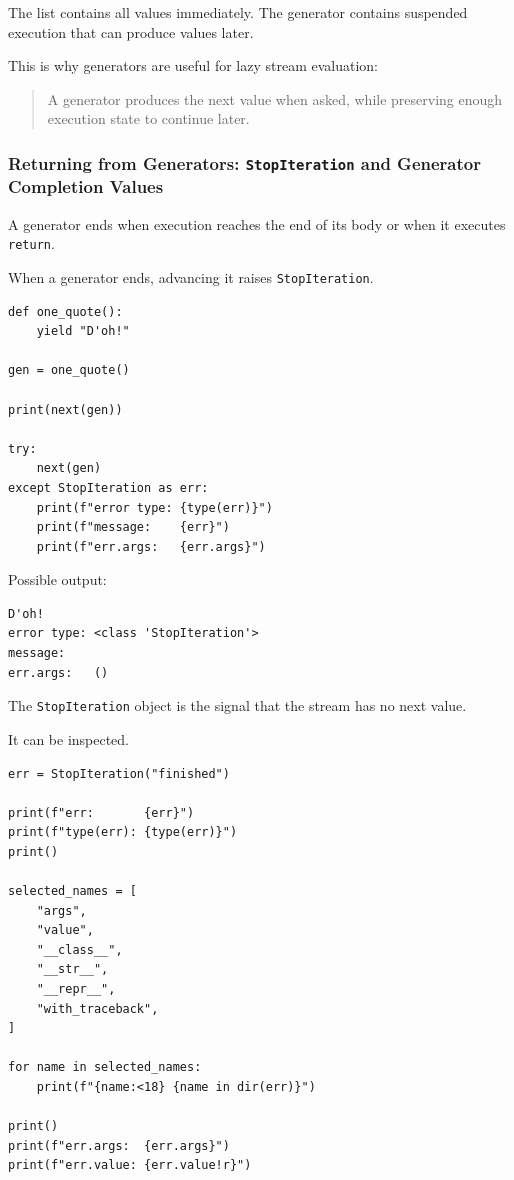 The list contains all values immediately. The generator contains suspended execution that can produce values later.

This is why generators are useful for lazy stream evaluation:

\begin{quote}
A generator produces the next value when asked, while preserving enough execution state to continue later.
\end{quote}

\subsubsection{Returning from Generators: \texttt{StopIteration} and Generator Completion Values}

A generator ends when execution reaches the end of its body or when it executes \texttt{return}.

When a generator ends, advancing it raises \texttt{StopIteration}.

\begin{verbatim}
def one_quote():
    yield "D'oh!"

gen = one_quote()

print(next(gen))

try:
    next(gen)
except StopIteration as err:
    print(f"error type: {type(err)}")
    print(f"message:    {err}")
    print(f"err.args:   {err.args}")
\end{verbatim}

Possible output:

\begin{verbatim}
D'oh!
error type: <class 'StopIteration'>
message:    
err.args:   ()
\end{verbatim}

The \texttt{StopIteration} object is the signal that the stream has no next value.

It can be inspected.

\begin{verbatim}
err = StopIteration("finished")

print(f"err:       {err}")
print(f"type(err): {type(err)}")
print()

selected_names = [
    "args",
    "value",
    "__class__",
    "__str__",
    "__repr__",
    "with_traceback",
]

for name in selected_names:
    print(f"{name:<18} {name in dir(err)}")

print()
print(f"err.args:  {err.args}")
print(f"err.value: {err.value!r}")
\end{verbatim}

